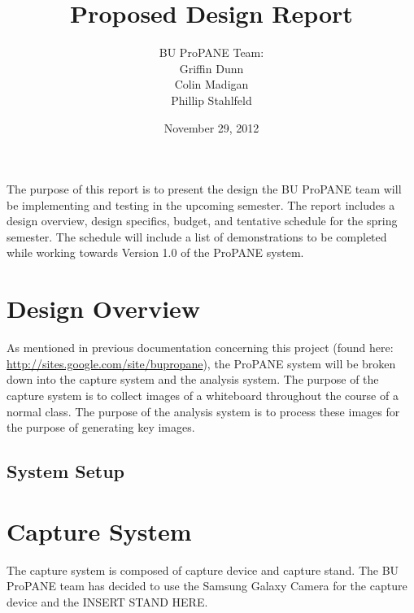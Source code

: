 \documentclass[]{article}
\begin{document}
	\setlength{\parindent}{0pt}
	\setlength{\parskip}{4pt}

	\begin{titlepage}



		\title{\textbf{Proposed Design Report}}
		\author{BU ProPANE Team:\\Griffin Dunn\\Colin Madigan\\Phillip Stahlfeld}
		\date{November 29, 2012}
		\maketitle



		\noindent
		The purpose of this report is to present the design the BU ProPANE team will be implementing and testing in the upcoming semester. The report includes a design overview, design specifics, budget, and tentative schedule for the spring semester. The schedule will include a list of demonstrations to be completed while working towards Version 1.0 of the ProPANE system. 
		\thispagestyle{empty}
		
		
		
	\end{titlepage}
	
	
	
	
	\tableofcontents
	\newpage
	
	\setcounter{page}{1}
	\thispagestyle{empty}
	
	\section{Design Overview}
		As mentioned in previous documentation concerning this project (found here: \url{http://sites.google.com/site/bupropane}), the ProPANE system will be broken down into the capture system and the analysis system. The purpose of the capture system is to collect images of a whiteboard throughout the course of a normal class. The purpose of the analysis system is to process these images for the purpose of generating key images. 
		
		\subsection{System Setup}
		
	\section{Capture System}
		The capture system is composed of capture device and capture stand. The BU ProPANE team has decided to use the Samsung Galaxy Camera for the capture device and the INSERT STAND HERE. 
			
\end{document}
